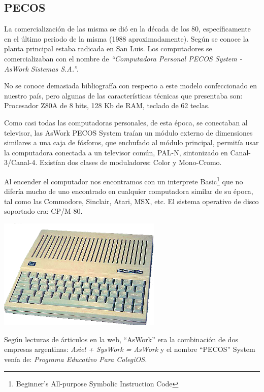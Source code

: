 \documentclass[%
 	final,
%
	notitlepage,
	narroweqnarray,
	inline,
 	twoside,
	]{ieee}
\begin{document}
\subsection*{PECOS}

La comercializaci\'on de las misma se di\'o en la d\'ecada de los 80, espec\'ificamente en el \'ultimo periodo de la misma (1988 aproximadamente). Seg\'un se conoce la planta principal estaba radicada en San Luis. Los computadores se comercializaban con el nombre de \textit{``Computadora Personal PECOS System - AsWork Sistemas S.A.''}.

No se conoce demasiada bibliograf\'ia con respecto a este modelo confeccionado en nuestro pa\'is, pero algunas de las caracter\'isticas t\'ecnicas que presentaba son: Procesador Z80A de 8 bits, 128 Kb de RAM, teclado de 62 teclas. 

Como casi todas las computadoras personales, de esta \'epoca, se conectaban al televisor, las AsWork PECOS System tra\'ian un m\'odulo externo de dimensiones similares a una caja de f\'osforos, que enchufado al m\'odulo principal, permit\'ia usar la computadora conectada a un televisor com\'un, PAL-N, sintonizado en Canal-3/Canal-4. Exist\'ian dos clases de moduladores: Color y Mono-Cromo. 

Al encender el computador nos encontramos con un interprete Basic\footnote{Beginner's All-purpose Symbolic Instruction Code} que no difer\'ia mucho de uno encontrado en cualquier computadora similar de su \'epoca, tal como las Commodore, Sinclair, Atari, MSX, etc. El sistema operativo de disco soportado era: CP/M-80.

\begin{center}\includegraphics[width=222pt, height=150pt]{pecos.png}\end{center}

Seg\'un lecturas de \'articulos en la web\cite{pecos}, ``AsWork'' era la combinaci\'on de dos empresas argentinas: \textit{Asiel + SysWork = AsWork} y el nombre ``PECOS'' System ven\'ia de: \textit{Programa Educativo Para ColegiOS.}
\end{document}
